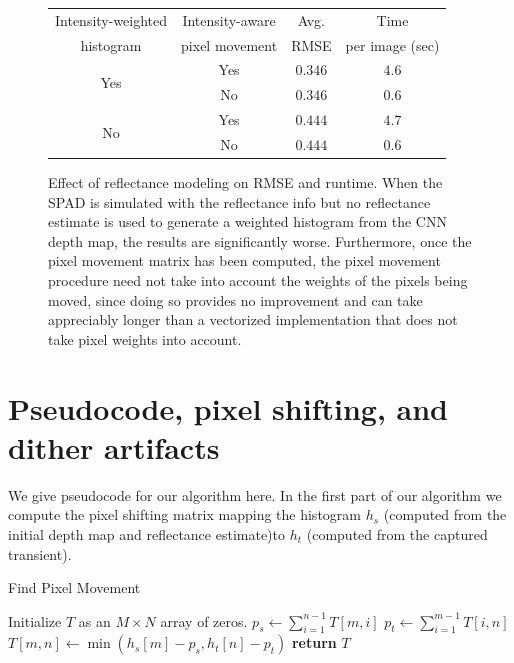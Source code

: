 \documentclass[runningheads]{llncs}
\begin{document}
\begin{figure}[H]
  \centering
  \begin{tabular}{c|c|c|c}
    \toprule
    Intensity-weighted & Intensity-aware & Avg. & Time \\ histogram & pixel movement & RMSE & per image (sec) \\
    \midrule
    \multirow{2}{*}{Yes} & Yes & $0.346$ & $4.6$ \\
                         & No & $0.346$ & $0.6$ \\
    \midrule
    \multirow{2}{*}{No} & Yes & $0.444$ & $4.7$ \\
                        & No & $0.444$ & $0.6$ \\
    \bottomrule
  \end{tabular}
  \caption{Effect of reflectance modeling on RMSE and runtime. When the SPAD
    is simulated with the reflectance info but no reflectance estimate is used
    to generate a weighted histogram from the CNN depth map, the results are
    significantly worse. Furthermore, once the pixel movement matrix has been
    computed, the pixel movement procedure need not take
    into account the weights of the pixels being moved, since doing so provides no
    improvement and can take appreciably longer than a vectorized implementation
    that does not take pixel weights into account.}
\end{figure}

\section{Pseudocode, pixel shifting, and dither artifacts}
We give pseudocode for our algorithm here. In the first part of our algorithm we
compute the pixel shifting matrix mapping the histogram $h_s$ (computed from the
initial depth map and reflectance estimate)to $h_t$ (computed from the captured
transient).
{ \footnotesize
\begin{algorithm}
 \caption{Find Pixel Movement} 
 \label{alg:ehm}
 \begin{algorithmic}
	\footnotesize
    \State Initialize $T$ as an $M \times N$ array of zeros.
        \State $p_s \gets \sum_{i=1}^{n-1} T[m, i]$
        \State $p_t \gets \sum_{i=1}^{m-1} T[i, n]$
        \State $T[m, n] \gets \min(h_s[m] - p_s, h_t[n] - p_t)$
      \EndFor
    \EndFor
    \State \textbf{return} $T$
  \EndProcedure
 \end{algorithmic}
\end{algorithm}
}
\end{document}
